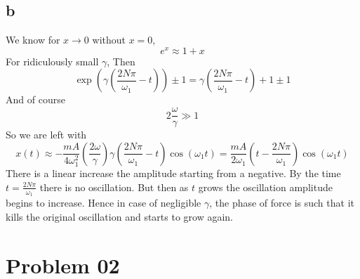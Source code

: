 \documentclass[10pts, letterpaper]{article}
\begin{document}
\subsection*{b}
We know for $x \to  0$ without $x = 0$, 
\[
e^{x} \approx 1 + x
\] 
For ridiculously small $\gamma$, 
Then 
\[
\exp \left(
\gamma 
\left(\frac{2 N \pi }{\omega_1 } - t\right)
\right) \pm 1  
=
\gamma 
\left(\frac{2 N \pi }{\omega_1 } - t\right) + 1 \pm 1 
\]
And of course  
\[
2 \frac{\omega}{\gamma} \gg 1 
\]
So we are left with 
 \[
 x(t) \approx - \frac{mA}{4 \omega_1^2} 
 \left( \frac{2 \omega }{ \gamma }\right)
\gamma 
\left(\frac{2 N \pi }{\omega_1 } - t\right)
 \cos(\omega_1 t) =
 \frac{mA}{2 \omega_1} 
\left( t- \frac{2 N \pi }{\omega_1 } \right)
 \cos(\omega_1 t)
 \] 
 There is a linear increase the amplitude starting from a negative. By the time $t = \frac{2 N \pi }{\omega_1}$ there is no oscillation. But then as $t$ grows the oscillation amplitude begins to increase. Hence in case of negligible $\gamma$, the phase of force is such that it kills the original oscillation and starts to grow again. 
\section*{Problem 02} 
\end{document}
